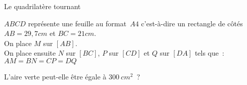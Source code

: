 \activite Le quadrilatère tournant

$ABCD$ représente une feuille au format~$A4$ c'est-à-dire un rectangle de côtés $AB = 29,7cm$ et $BC = 21cm$.\\
On place $M$ sur $[AB]$.\\
On place ensuite $N$ sur $[BC]$, $P$ sur $[CD]$ et $Q$ sur $[DA]$ tels que~:\\ $AM = BN = CP = DQ$



L'aire verte peut-elle être égale à $300~cm^2$~?